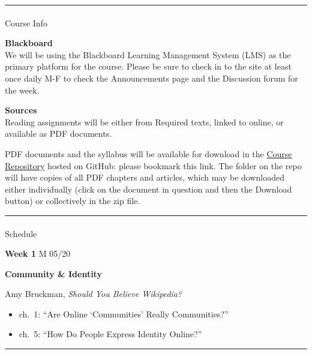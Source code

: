 \documentclass[
  letterpaper,
  DIV=11,
  numbers=noendperiod,
  oneside]{scrartcl}
\makeatletter
\let\oldparagraph\paragraph
\renewcommand{\paragraph}{
    \@ifstar
      \xxxParagraphStar
      \xxxParagraphNoStar
  }
\newcommand{\xxxParagraphStar}[1]{\oldparagraph*{#1}\mbox{}}
\newcommand{\xxxParagraphNoStar}[1]{\oldparagraph{#1}\mbox{}}
\providecommand{\tightlist}{%
  \setlength{\itemsep}{0pt}\setlength{\parskip}{0pt}}\usepackage{longtable,booktabs,array}
\makeatother
\begin{document}
\begin{center}\rule{0.5\linewidth}{0.5pt}\end{center}

\paragraph{Course Info}\label{course-info}

\textbf{Blackboard}\\
We will be using the Blackboard Learning Management System (LMS) as the
primary platform for the course. Please be sure to check in to the site
at least once daily M-F to check the Announcements page and the
Discussion forum for the week.

\textbf{Sources}\\
Reading assignments will be either from Required texts, linked to
online, or available as PDF documents.

PDF documents and the syllabus will be available for download in the
\href{https://github.com/mroberts1/social-media-theory-summer-2022}{Course
Repository} hosted on GitHub: please bookmark this link. The folder on
the repo will have copies of all PDF chapters and articles, which may be
downloaded either individually (click on the document in question and
then the Download button) or collectively in the zip file.

\begin{center}\rule{0.5\linewidth}{0.5pt}\end{center}

\paragraph{Schedule}\label{schedule}

\textbf{Week 1} M 05/20

\textbf{Community \& Identity}

Amy Bruckman, \emph{Should You Believe Wikipedia?}

\begin{itemize}
\tightlist
\item
  ch.~1: ``Are Online `Communities' Really Communities?''
\item
  ch.~5: ``How Do People Express Identity Online?''
\end{itemize}

\begin{center}\rule{0.5\linewidth}{0.5pt}\end{center}
\end{document}
